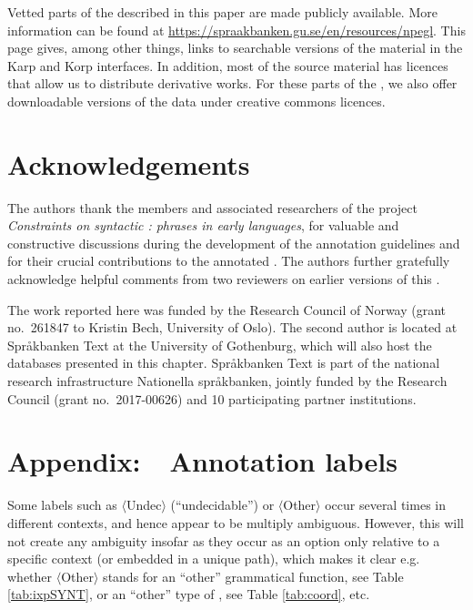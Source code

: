 \documentclass[output=paper,colorlinks,citecolor=brown]{langscibook}
\begin{document}
Vetted parts of the  described in this paper are made publicly available. More information can be found at \url{https://spraakbanken.gu.se/en/resources/npegl}. This page gives, among other things, links to searchable versions of the material in the Karp and Korp interfaces. In addition, most of the source material has licences that allow us to distribute derivative works. For these parts of the , we also offer downloadable versions of the data under creative commons licences.


\section*{Acknowledgements}\largerpage[2]

\begin{sloppypar}
The authors thank the members and associated researchers of the project \textit{Constraints on syntactic :  phrases in early  languages}, for valuable and constructive discussions during the development of the annotation guidelines and for their  crucial contributions to the annotated . The authors further gratefully acknowledge helpful comments from two reviewers on earlier versions of this .
\end{sloppypar}

The work reported here was funded by the Research Council of Norway (grant no.\ 261847 to Kristin Bech, University of Oslo). The second author is located at Språkbanken Text at the University of Gothenburg, which will also host the databases presented in this chapter. Språkbanken Text is part of the  national research infrastructure Nationella språkbanken, jointly funded by the  Research Council (grant no.\ 2017-00626) and 10 participating partner institutions.

\section*{Appendix:~~Annotation labels}
\label{sec:APPX}

Some labels such as $\langle$Undec$\rangle$ (``undecidable'') or $\langle$Other$\rangle$ occur several times in different contexts, and hence appear to be multiply ambiguous. However,  this will not create any ambiguity insofar as they occur as an option only relative to a specific context (or embedded in a unique path), which makes it clear e.g. whether $\langle$Other$\rangle$ stands for an ``other'' grammatical function, see Table \ref{tab:ixpSYNT},  or an ``other'' type of , see Table \ref{tab:coord}, etc. %
\end{document}
